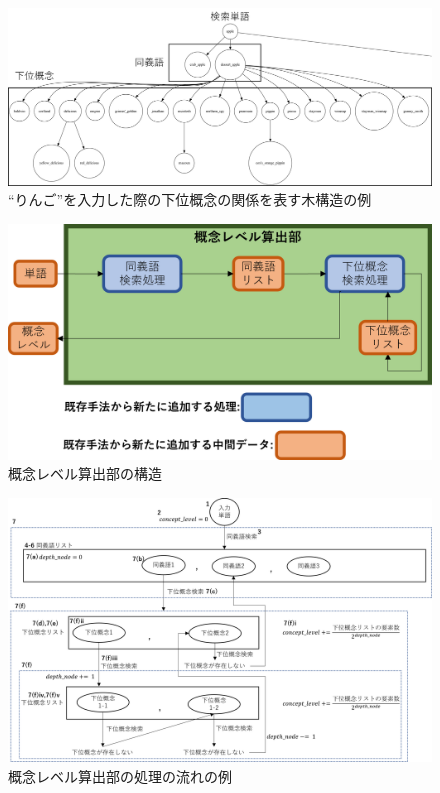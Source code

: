 \begin{figure}[t]
    \begin{center}
        \includegraphics[width=1.0\columnwidth]{image/tree_structure.png}
        \caption{``りんご''を入力した際の下位概念の関係を表す木構造の例}
        \label{fig:tree_structure}
    \end{center}
\end{figure}

\begin{figure}[t]
    \begin{center}
        \includegraphics[width=1.0\columnwidth]{image/vgml_concept_level_structure.png}
        \caption{概念レベル算出部の構造}
        \label{fig:vgml_concept_level_structure}
    \end{center}
\end{figure}

\begin{figure}[t]
    \begin{center}
        \includegraphics[width=1.0\columnwidth]{image/flow_calc_concept_level.png}
        \caption{概念レベル算出部の処理の流れの例}
        \label{fig:flow_calc_concept_level}
    \end{center}
\end{figure}

